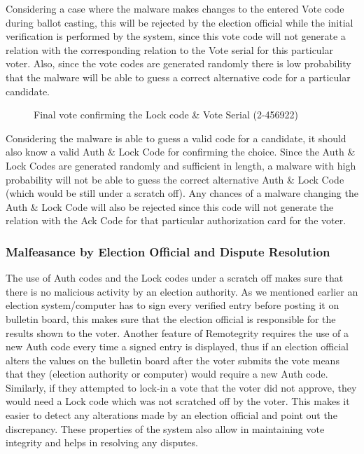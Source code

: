 Considering a case where the malware makes changes to the entered Vote
code during ballot casting, this will be rejected by the election
official while the initial verification is performed by the system,
since this vote code will not generate a relation with the
corresponding relation to the Vote serial for this particular
voter. Also, since the vote codes are generated randomly there is low
probability that the malware will be able to guess a correct
alternative code for a particular candidate.

\begin{figure}
  \centering {}
  \caption{Final vote confirming the Lock code \& Vote Serial
    (2-456922)}
  \label{fig:remotegrity-lock}
\end{figure}

Considering the malware is able to guess a valid code for a candidate,
it should also know a valid Auth \& Lock Code for confirming the
choice. Since the Auth \& Lock Codes are generated randomly and
sufficient in length, a malware with high probability will not be able
to guess the correct alternative Auth \& Lock Code (which would be
still under a scratch off). Any chances of a malware changing the Auth
\& Lock Code will also be rejected since this code will not generate
the relation with the Ack Code for that particular authorization card
for the voter.

\subsubsection{Malfeasance by Election Official and Dispute Resolution}

The use of Auth codes and the Lock codes under a scratch off makes
sure that there is no malicious activity by an election authority. As
we mentioned earlier an election system/computer has to sign every
verified entry before posting it on bulletin board, this makes sure
that the election official is responsible for the results shown to the
voter. Another feature of Remotegrity requires the use of a new Auth
code every time a signed entry is displayed, thus if an election
official alters the values on the bulletin board after the voter
submits the vote means that they (election authority or computer)
would require a new Auth code. Similarly, if they attempted to lock-in
a vote that the voter did not approve, they would need a Lock code
which was not scratched off by the voter. This makes it easier to
detect any alterations made by an election official and point out the
discrepancy. These properties of the system also allow in maintaining
vote integrity and helps in resolving any disputes.

